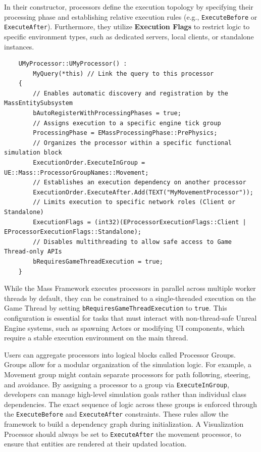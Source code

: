 In their constructor, processors define the execution topology by specifying their processing phase and establishing relative execution rules (e.g., \texttt{ExecuteBefore} or \texttt{ExecuteAfter}). Furthermore, they utilize \textbf{Execution Flags} to restrict logic to specific environment types, such as dedicated servers, local clients, or standalone instances. 

\begin{lstlisting}
    UMyProcessor::UMyProcessor() : 
        MyQuery(*this) // Link the query to this processor
    {
        // Enables automatic discovery and registration by the MassEntitySubsystem
        bAutoRegisterWithProcessingPhases = true;
        // Assigns execution to a specific engine tick group
        ProcessingPhase = EMassProcessingPhase::PrePhysics;
        // Organizes the processor within a specific functional simulation block
        ExecutionOrder.ExecuteInGroup = UE::Mass::ProcessorGroupNames::Movement;
        // Establishes an execution dependency on another processor
        ExecutionOrder.ExecuteAfter.Add(TEXT("MyMovementProcessor"));
        // Limits execution to specific network roles (Client or Standalone)
        ExecutionFlags = (int32)(EProcessorExecutionFlags::Client | EProcessorExecutionFlags::Standalone);
        // Disables multithreading to allow safe access to Game Thread-only APIs
        bRequiresGameThreadExecution = true;
    }
\end{lstlisting}

While the Mass Framework executes processors in parallel across multiple worker threads by default, they can be constrained to a single-threaded execution on the Game Thread by setting \texttt{bRequiresGameThreadExecution} to \texttt{true}. This configuration is essential for tasks that must interact with non-thread-safe Unreal Engine systems, such as spawning Actors or modifying UI components, which require a stable execution environment on the main thread.

Users can aggregate processors into logical blocks called Processor Groups. Groups allow for a modular organization of the simulation logic. For example, a Movement group might contain separate processors for path following, steering, and avoidance. By assigning a processor to a group via \texttt{ExecuteInGroup}, developers can manage high-level simulation goals rather than individual class dependencies.
The exact sequence of logic across these groups is enforced through the \texttt{ExecuteBefore} and \texttt{ExecuteAfter} constraints. These rules allow the framework to build a dependency graph during initialization. A Visualization Processor should always be set to \texttt{ExecuteAfter} the movement processor, to ensure that entities are rendered at their updated location.
\newline

